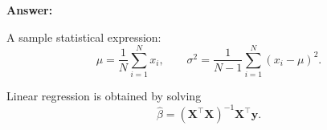 \documentclass[12pt]{article}
\begin{document}
\textbf{Answer:}\\
\lipsum[8]

A sample statistical expression:
\begin{equation}
\mu = \frac{1}{N}\sum_{i=1}^{N} x_i, \qquad \sigma^{2} = \frac{1}{N-1}\sum_{i=1}^{N}(x_i-\mu)^{2}.
\end{equation}

Linear regression is obtained by solving
\begin{equation}
\hat{\beta} = (\mathbf{X}^{\top}\mathbf{X})^{-1}\mathbf{X}^{\top}\mathbf{y}.
\end{equation}

\end{document}
